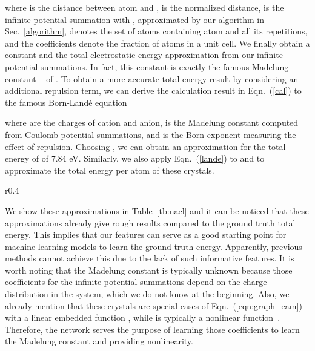 \documentclass[nohyperref]{article}
\theoremstyle{plain}
\theoremstyle{definition}
\theoremstyle{remark}
\begin{document}
where  is the distance between atom  and ,  is the normalized distance,  is the infinite potential summation with , approximated by our algorithm in Sec.~\ref{algorithm},  denotes the set of atoms containing atom  and all its repetitions, and the coefficients  denote the fraction of atoms in a unit cell. We finally obtain a constant  and the total electrostatic energy approximation  from our infinite potential summations. In fact, this constant  is exactly the famous Madelung constant ~\citep{borwein1985convergence} of . To obtain a more accurate total energy result by considering an additional repulsion term, we can derive the calculation result in Eqn.~(\ref{cal}) to the famous Born-Land\'e equation~\citep{BornConj}


where  are the charges of cation and anion,  is the Madelung constant computed from Coulomb potential summations, and  is the Born exponent measuring the effect of repulsion. Choosing , we can obtain an approximation for the total energy of  of 7.84 eV. Similarly, we also apply Eqn.~(\ref{lande}) to  and  to approximate the total energy per atom of these crystals. 

\begin{wraptable}[7]{r}{0.4\textwidth}
\vspace{-15 pt}
\begin{center}
\caption{Total energy per atom approximation of ,  and .}\vspace{-0.3cm}
\label{tb:nacl}
\end{center}
\end{wraptable} We show these approximations in Table~\ref{tb:nacl} and it can be noticed that these approximations already give rough results compared to the ground truth total energy. This implies that our features can serve as a good starting point for machine learning models to learn the ground truth energy. Apparently, previous methods cannot achieve this due to the lack of such informative features. It is worth noting that the Madelung constant is typically unknown because those coefficients for the infinite potential summations depend on the charge distribution in the system, which we do not know at the beginning. Also, we already mention that these crystals are special cases of Eqn.~(\ref{eqn:graph_eam}) with a linear embedded function , while  is typically a nonlinear function~\citep{daw1984embedded}. Therefore, the network serves the purpose of learning those coefficients to learn the Madelung constant and providing nonlinearity.
\end{document}
